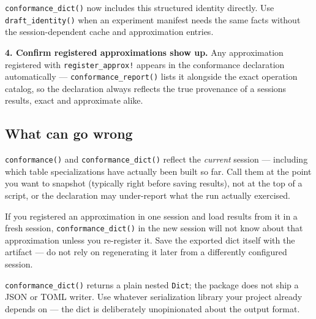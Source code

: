 \texttt{conformance\_\allowbreak{}dict()} now includes this structured identity directly. Use \texttt{draft\_\allowbreak{}identity()} when an experiment manifest needs the same facts without the session-dependent cache and approximation entries.



\textbf{4. Confirm registered approximations show up.} Any approximation registered with \texttt{register\_\allowbreak{}approx!} appears in the conformance declaration automatically — \texttt{conformance\_\allowbreak{}report()} lists it alongside the exact operation catalog, so the declaration always reflects the true provenance of a session{\textquotesingle}s results, exact and approximate alike.



\subsection{What can go wrong}



\label{7385351218440078181-dup6}{}


\begin{tcolorbox}[toptitle=-1mm,bottomtitle=1mm,colback=admonition-note!50!white,colframe=admonition-note,title=\textbf{The declaration is live, not static}]
\texttt{conformance()} and \texttt{conformance\_\allowbreak{}dict()} reflect the \emph{current} session — including which table specializations have actually been built so far. Call them at the point you want to snapshot (typically right before saving results), not at the top of a script, or the declaration may under-report what the run actually exercised.

\end{tcolorbox}


\begin{tcolorbox}[toptitle=-1mm,bottomtitle=1mm,colback=admonition-warning!50!white,colframe=admonition-warning,title=\textbf{A conformance dict does not travel with unregistered approximations}]
If you registered an approximation in one session and load results from it in a fresh session, \texttt{conformance\_\allowbreak{}dict()} in the new session will not know about that approximation unless you re-register it. Save the exported dict itself with the artifact — do not rely on regenerating it later from a differently configured session.

\end{tcolorbox}


\begin{tcolorbox}[toptitle=-1mm,bottomtitle=1mm,colback=admonition-note!50!white,colframe=admonition-note,title=\textbf{JSON/TOML serialization is your responsibility, not the package{\textquotesingle}s}]
\texttt{conformance\_\allowbreak{}dict()} returns a plain nested \texttt{Dict}; the package does not ship a JSON or TOML writer. Use whatever serialization library your project already depends on — the dict is deliberately unopinionated about the output format.

\end{tcolorbox}


